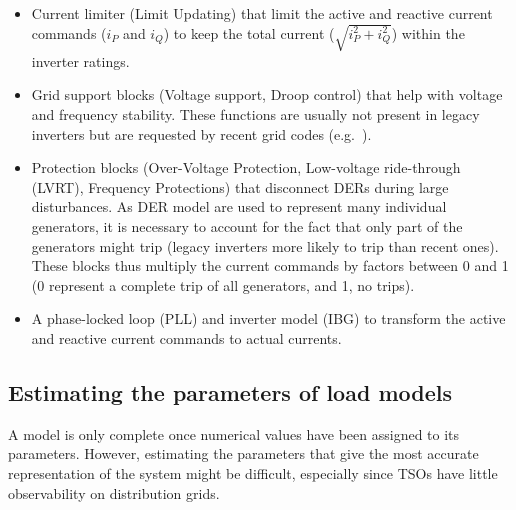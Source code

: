 \begin{itemize}
    \item Current limiter (Limit Updating) that limit the active and reactive current commands (\(i_P\) and \(i_Q\)) to keep the total current (\(\sqrt{i_P^2 + i_Q^2}\)) within the inverter ratings.
    \item Grid support blocks (Voltage support, Droop control) that help with voltage and frequency stability. These functions are usually not present in legacy inverters but are requested by recent grid codes (e.g.~\cite{G99}).
    \item Protection blocks (Over-Voltage Protection, Low-voltage ride-through (LVRT), Frequency Protections) that disconnect DERs during large disturbances. As DER model are used to represent many individual generators, it is necessary to account for the fact that only part of the generators might trip (legacy inverters more likely to trip than recent ones). These blocks thus multiply the current commands by factors between 0 and 1 (0 represent a complete trip of all generators, and 1, no trips).
    \item A phase-locked loop (PLL) and inverter model (IBG) to transform the active and reactive current commands to actual currents.
\end{itemize}




\subsection{Estimating the parameters of load models}
\label{sec:load_parameters}

A model is only complete once numerical values have been assigned to its parameters. However, estimating the parameters that give the most accurate representation of the system might be difficult, especially since TSOs have little observability on distribution grids.


